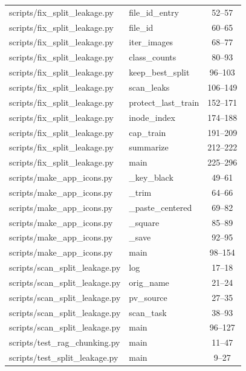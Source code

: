 \begin{center}
\begin{longtable}{@{}p{4.6cm}p{5.2cm}c@{}}
scripts/fix\_split\_leakage.py & file\_id\_entry & 52--57 \\
scripts/fix\_split\_leakage.py & file\_id & 60--65 \\
scripts/fix\_split\_leakage.py & iter\_images & 68--77 \\
scripts/fix\_split\_leakage.py & class\_counts & 80--93 \\
scripts/fix\_split\_leakage.py & keep\_best\_split & 96--103 \\
scripts/fix\_split\_leakage.py & scan\_leaks & 106--149 \\
scripts/fix\_split\_leakage.py & protect\_last\_train & 152--171 \\
scripts/fix\_split\_leakage.py & inode\_index & 174--188 \\
scripts/fix\_split\_leakage.py & cap\_train & 191--209 \\
scripts/fix\_split\_leakage.py & summarize & 212--222 \\
scripts/fix\_split\_leakage.py & main & 225--296 \\
scripts/make\_app\_icons.py & \_key\_black & 49--61 \\
scripts/make\_app\_icons.py & \_trim & 64--66 \\
scripts/make\_app\_icons.py & \_paste\_centered & 69--82 \\
scripts/make\_app\_icons.py & \_square & 85--89 \\
scripts/make\_app\_icons.py & \_save & 92--95 \\
scripts/make\_app\_icons.py & main & 98--154 \\
scripts/scan\_split\_leakage.py & log & 17--18 \\
scripts/scan\_split\_leakage.py & orig\_name & 21--24 \\
scripts/scan\_split\_leakage.py & pv\_source & 27--35 \\
scripts/scan\_split\_leakage.py & scan\_task & 38--93 \\
scripts/scan\_split\_leakage.py & main & 96--127 \\
scripts/test\_rag\_chunking.py & main & 11--47 \\
scripts/test\_split\_leakage.py & main & 9--27 \\
\bottomrule
\end{longtable}
\end{center}